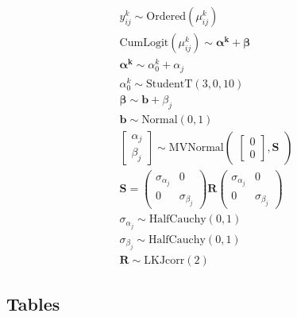 \documentclass[man]{article}%
\begin{document}
$$
\begin{align}
y_{ij}^k \sim \text{Ordered}(\mu_{ij}^k) \nonumber\\
\text{CumLogit}(\mu_{ij}^k)\sim \boldsymbol{\alpha^k +\beta} \nonumber\\
\boldsymbol{\alpha^k} \sim \alpha_{0}^k +\alpha_j \nonumber\\
\alpha_{0}^k \sim \text{StudentT}(3,0,10)\nonumber\\
\boldsymbol{\beta}\sim \boldsymbol{b} + \beta_j \nonumber\\
\boldsymbol{b}\sim\text{Normal}(0,1) \nonumber\\
\begin{bmatrix}
\alpha_j \\
\beta_j
\end{bmatrix}
\sim 
\text{MVNormal}
\begin{pmatrix}
\begin{bmatrix}
0\\
0
\end{bmatrix}
,\boldsymbol{S} \nonumber
\end{pmatrix}\\
\boldsymbol{S} = 
\begin{pmatrix}
\sigma_{\alpha_j} & 0 \\
0 & \sigma_{\beta_j} \nonumber
\end{pmatrix} \boldsymbol{R} \begin{pmatrix}
\sigma_{\alpha_j} & 0 \\
0 & \sigma_{\beta_j} \nonumber
\end{pmatrix}\\
\sigma_{\alpha_j} \sim 
\text{HalfCauchy}(0,1) \nonumber\\
\sigma_{\beta_j} \sim 
\text{HalfCauchy}(0,1) \nonumber\\
\boldsymbol{R}\sim \text{LKJcorr}(2) \nonumber
\end{align}
$$

\newpage


\subsection{Tables}
\label{app:Tables}
\end{document}
